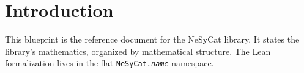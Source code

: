 

\section{Introduction}  %

This blueprint is the reference document for the NeSyCat library. It
states the library's mathematics, organized by mathematical structure.
The Lean formalization lives in the flat \texttt{NeSyCat.\textit{name}}
namespace.

